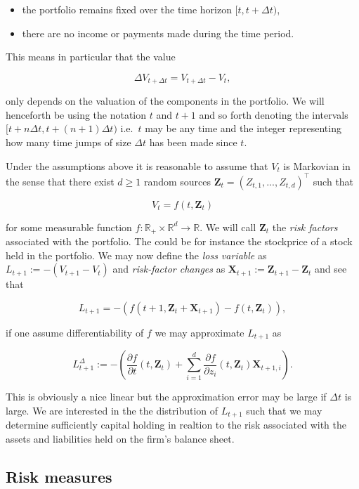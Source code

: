 \documentclass[a4paper,12pt,openany]{book}
\providecommand{\tightlist}{%
 \setlength{\itemsep}{0pt}\setlength{\parskip}{0pt}}
\begin{document}
\begin{itemize}
\tightlist
\item
  the portfolio remains fixed over the time horizon \([t,t+\Delta t)\),
\item
  there are no income or payments made during the time period.
\end{itemize}

This means in particular that the value

\[
\Delta V_{t+\Delta t}=V_{t+\Delta t}-V_t,
\]

only depends on the valuation of the components in the portfolio. We will henceforth be using the notation \(t\) and \(t+1\) and so forth denoting the intervals \([t+n\Delta t,t+(n+1)\Delta t)\) i.e.~\(t\) may be any time and the integer representing how many time jumps of size \(\Delta t\) has been made since \(t\).

Under the assumptions above it is reasonable to assume that \(V_t\) is Markovian in the sense that there exist \(d\ge 1\) random sources \(\mathbf{Z}_t=(Z_{t,1},...,Z_{t,d})^\top\) such that

\[
V_t=f(t,\mathbf{Z}_t)\tag{2.2}
\]

for some measurable function \(f : \mathbb{R}_+\times \mathbb{R}^d\to\mathbb{R}\). We will call \(\mathbf{Z}_t\) the \emph{risk factors} associated with the portfolio. The could be for instance the stockprice of a stock held in the portfolio. We may now define the \emph{loss variable} as \(L_{t+1}:=-(V_{t+1}-V_t)\) and \emph{risk-factor changes} as \(\mathbf{X}_{t+1}:=\mathbf{Z}_{t+1}-\mathbf{Z}_t\) and see that

\[
L_{t+1}=-\left(f(t+1,\mathbf{Z}_t+\mathbf{X}_{t+1})-f(t,\mathbf{Z}_t)\right),\tag{2.3}
\]

if one assume differentiability of \(f\) we may approximate \(L_{t+1}\) as

\[
L_{t+1}^\Delta:=-\left(\frac{\partial f}{\partial t}(t,\mathbf{Z}_t)+\sum_{i=1}^d \frac{\partial f}{\partial z_i}(t,\mathbf{Z}_t)\mathbf{X}_{t+1,i}\right).\tag{2.4}
\]

This is obviously a nice linear but the approximation error may be large if \(\Delta t\) is large. We are interested in the the distribution of \(L_{t+1}\) such that we may determine sufficiently capital holding in realtion to the risk associated with the assets and liabilities held on the firm's balance sheet.

\hypertarget{risk-measures}{%
\subsection{Risk measures}\label{risk-measures}}
\end{document}
